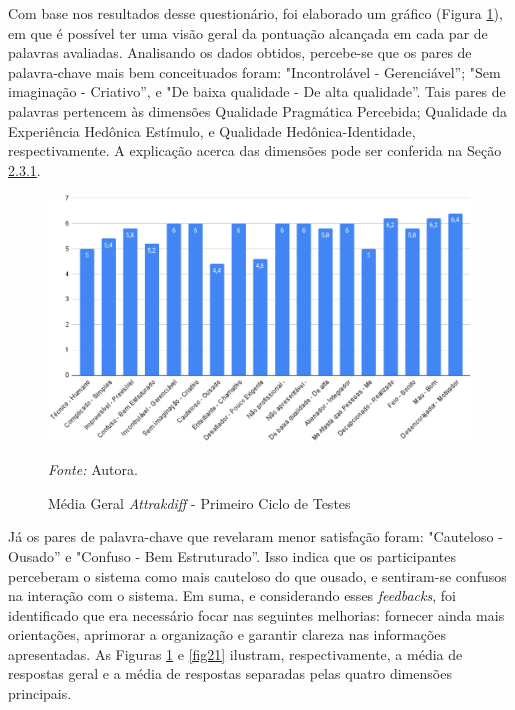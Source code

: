 Com base nos resultados desse questionário, foi elaborado um gráfico (Figura \ref{fig20}), em que é possível ter uma visão geral da pontuação alcançada em cada par de palavras avaliadas. Analisando os dados obtidos, percebe-se que os pares de palavra-chave mais bem conceituados foram: "Incontrolável - Gerenciável''; "Sem imaginação - Criativo'', e "De baixa qualidade - De alta qualidade''. 
Tais pares de palavras pertencem às dimensões Qualidade Pragmática Percebida; Qualidade da Experiência Hedônica Estímulo, e Qualidade Hedônica-Identidade, respectivamente. A explicação acerca das dimensões 
pode ser conferida na Seção \hyperref[sec:Medicao2]{2.3.1}. 

\begin{figure}[h!]
	\centering
	\caption{Média Geral \textit{Attrakdiff} - Primeiro Ciclo de Testes}
	\begin{adjustbox}{center}
		\includegraphics[width=1\textwidth]{figuras/media-geral.eps}
	\end{adjustbox}
	\begin{tablenotes}[flushleft]
		\centering
		\item \textit{Fonte:} Autora.
	\end{tablenotes}
	\label{fig20}
\end{figure}

Já os pares de palavra-chave que revelaram menor satisfação foram: "Cauteloso - Ousado'' e "Confuso - Bem Estruturado''. Isso indica que os participantes perceberam o sistema como mais cauteloso do que ousado, e 
sentiram-se confusos na interação com o sistema. Em suma, e considerando esses \textit{feedbacks}, foi identificado que era necessário focar nas seguintes melhorias: fornecer ainda mais orientações, aprimorar a 
organização e garantir clareza nas informações apresentadas. As Figuras \ref{fig20} e \ref{fig21} ilustram, respectivamente, a média de respostas geral e a média de respostas separadas pelas quatro dimensões principais. 

